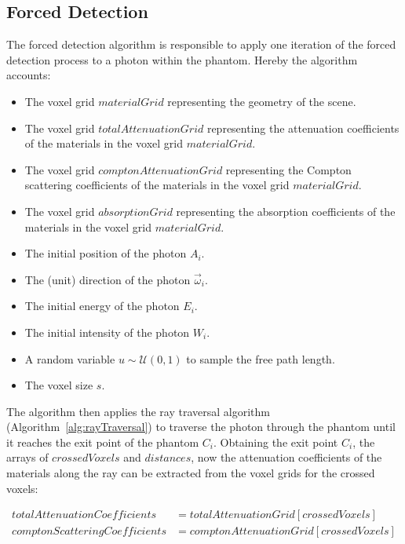 \begin{algorithm}[H]
\begin{algorithmic}[1]
    \end{algorithmic}
\end{algorithm}

\subsection{Forced Detection}

The forced detection algorithm is responsible to apply one iteration of the
forced detection process to a photon within the phantom. Hereby the algorithm
accounts:

\begin{itemize}
    \item The voxel grid $materialGrid$ representing the geometry of the scene.
    \item The voxel grid $totalAttenuationGrid$ representing the attenuation coefficients of the materials in the voxel grid $materialGrid$.
    \item The voxel grid $comptonAttenuationGrid$ representing the Compton scattering coefficients of the materials in the voxel grid $materialGrid$.
    \item The voxel grid $absorptionGrid$ representing the absorption coefficients of the materials in the voxel grid $materialGrid$.
    \item The initial position of the photon $A_i$.
    \item The (unit) direction of the photon $\vec{\omega}_i$.
    \item The initial energy of the photon $E_i$.
    \item The initial intensity of the photon $W_i$.
    \item A random variable $u \sim \mathcal{U}(0, 1)$ to sample the free path length.
    \item The voxel size $s$.
\end{itemize}

The algorithm then applies the ray traversal algorithm
(Algorithm~\ref{alg:rayTraversal}) to traverse the photon through the phantom
until it reaches the exit point of the phantom $C_i$. Obtaining the exit point
$C_i$, the arrays of $crossedVoxels$ and $distances$, now the attenuation
coefficients of the materials along the ray can be extracted from the voxel
grids for the crossed voxels:

\begin{align*}
    \label{eq:gatAttenuation}
    totalAttenuationCoefficients &= totalAttenuationGrid[crossedVoxels] \\
    comptonScatteringCoefficients &= comptonAttenuationGrid[crossedVoxels]
\end{align*}

